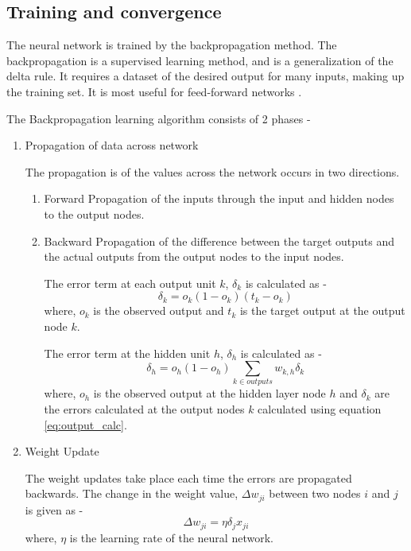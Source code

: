 \documentclass[a4paper,12bp]{report}
\begin{document}
\subsection{Training and convergence}
\label{subsec:training}

The neural network is trained by the backpropagation method. The backpropagation is a supervised learning method, and is a generalization of the delta rule. It requires a dataset of the desired output for many inputs, making up the training set. It is most useful for feed-forward networks \cite{ wiki:20147}. 

The Backpropagation learning algorithm consists of 2 phases -
\begin{enumerate}
\item Propagation of data across network

The propagation is of the values across the network occurs in two directions.
\begin{enumerate}
\item Forward Propagation of the inputs through the input and hidden nodes to the output nodes. 
\item Backward Propagation of the difference between the target outputs and the actual outputs from the output nodes to the input nodes.

The error term at each output unit $k$, $\delta_k$ is calculated as - 
\begin{equation}
\delta_k = o_k ( 1 - o_k) (t_k - o_k)
\end{equation}
where, $o_k$ is the observed output and $t_k$ is the target output at the output node $k$.

The error term at the hidden unit $h$, $\delta_h$ is calculated as - 
\begin{equation}
\label{eq:output_calc}
\delta_h = o_h(1 - o_h) \sum_{k \in outputs} w_{k,h} \delta_k
\end{equation}
where, $o_h$ is the observed output at the hidden layer node $h$ and $\delta_k$ are the errors calculated at the output nodes $k$ calculated using equation \ref{eq:output_calc}. 
\end{enumerate}
\item Weight Update

The weight updates take place each time the errors are propagated backwards. The change in the weight value, $\Delta w_{ji}$ between two nodes $i$ and $j$ is given as - 
\begin{equation}
\Delta w_{ji} = \eta \delta_j x_{ji}
\end{equation}
where, $\eta$ is the learning rate of the neural network. 


\end{enumerate}
\end{document}
